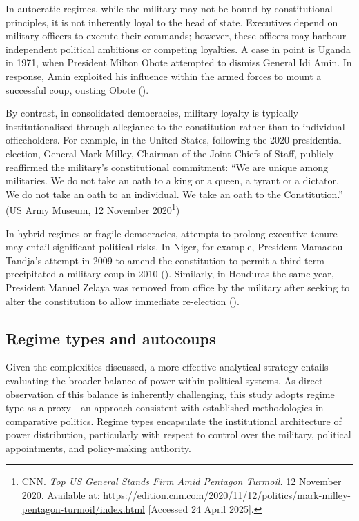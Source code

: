 \documentclass[
  12pt,
]{report}
\begin{document}
In autocratic regimes, while the military may not be bound by
constitutional principles, it is not inherently loyal to the head of
state. Executives depend on military officers to execute their commands;
however, these officers may harbour independent political ambitions or
competing loyalties. A case in point is Uganda in 1971, when President
Milton Obote attempted to dismiss General Idi Amin. In response, Amin
exploited his influence within the armed forces to mount a successful
coup, ousting Obote ().

By contrast, in consolidated democracies, military loyalty is typically
institutionalised through allegiance to the constitution rather than to
individual officeholders. For example, in the United States, following
the 2020 presidential election, General Mark Milley, Chairman of the
Joint Chiefs of Staff, publicly reaffirmed the military's constitutional
commitment: ``We are unique among militaries. We do not take an oath to
a king or a queen, a tyrant or a dictator. We do not take an oath to an
individual. We take an oath to the Constitution.'' (US Army Museum, 12
November 2020\footnote{CNN. \emph{Top US General Stands Firm Amid
  Pentagon Turmoil.} 12 November 2020. Available at:
  \url{https://edition.cnn.com/2020/11/12/politics/mark-milley-pentagon-turmoil/index.html}
  {[}Accessed 24 April 2025{]}.})

In hybrid regimes or fragile democracies, attempts to prolong executive
tenure may entail significant political risks. In Niger, for example,
President Mamadou Tandja's attempt in 2009 to amend the constitution to
permit a third term precipitated a military coup in 2010
(). Similarly, in Honduras the
same year, President Manuel Zelaya was removed from office by the
military after seeking to alter the constitution to allow immediate
re-election ().

\subsection*{Regime types and
autocoups}\label{regime-types-and-autocoups}

Given the complexities discussed, a more effective analytical strategy
entails evaluating the broader balance of power within political
systems. As direct observation of this balance is inherently
challenging, this study adopts regime type as a proxy---an approach
consistent with established methodologies in comparative politics.
Regime types encapsulate the institutional architecture of power
distribution, particularly with respect to control over the military,
political appointments, and policy-making authority.
\end{document}
